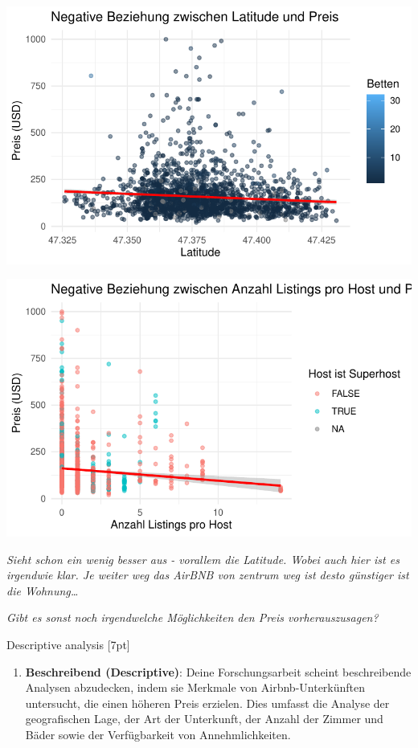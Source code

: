 \documentclass[
  journal,
]{IEEEtran}%
\providecommand{\tightlist}{%
  \setlength{\itemsep}{0pt}\setlength{\parskip}{0pt}}\usepackage{longtable,booktabs,array}
\begin{document}
\includegraphics{main_files/figure-pdf/unnamed-chunk-9-2.pdf}

\includegraphics{main_files/figure-pdf/unnamed-chunk-9-3.pdf}

\emph{Sieht schon ein wenig besser aus - vorallem die Latitude. Wobei
auch hier ist es irgendwie klar. Je weiter weg das AirBNB von zentrum
weg ist desto günstiger ist die Wohnung\ldots{}}

\emph{Gibt es sonst noch irgendwelche Möglichkeiten den Preis
vorherauszusagen?}

Descriptive analysis {[}7pt{]}

\begin{enumerate}
\def\labelenumi{\arabic{enumi}.}
\tightlist
\item
  \textbf{Beschreibend (Descriptive)}: Deine Forschungsarbeit scheint
  beschreibende Analysen abzudecken, indem sie Merkmale von
  Airbnb-Unterkünften untersucht, die einen höheren Preis erzielen. Dies
  umfasst die Analyse der geografischen Lage, der Art der Unterkunft,
  der Anzahl der Zimmer und Bäder sowie der Verfügbarkeit von
  Annehmlichkeiten.
\end{enumerate}
\end{document}
